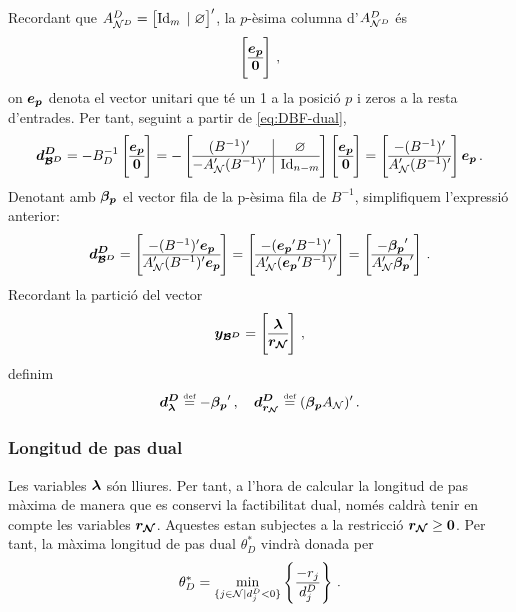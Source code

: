 Recordant que $A^D_{\mathcal{N}^D} = \left[\operatorname{Id}_{m} \;|\; \varnothing \right]'$, la 
$p$-èsima columna d'$A^D_{\mathcal{N}^D}$ és
\[
\left[
\begin{array}{@{}c@{}}
\vb{e_p}\\
\hline
\vb{0}
\end{array}
\right]\,,
\]
on $\boldsymbol{e_p}$ denota el vector unitari que té un 1 a la posició $p$ i zeros a 
la resta d'entrades. Per tant, seguint a partir de \eqref{eq:DBF-dual},
\[
\vb{d^D_{\B^D}} = -B^{-1}_D
\left[
\begin{array}{@{}c@{}}
\vb{e_p}\\
\hline
\vb{0}
\end{array}
\right]
%
= 
%
- \left[
\begin{array}{@{}c|c@{}}
(B^{-1})'	  &	\varnothing	\\
\hline
-A_\N'(B^{-1})' & \Id_{n-m}
\end{array}
\right]
\left[
\begin{array}{@{}c@{}}
\vb{e_p}\\
\hline
\vb{0}
\end{array}
\right]
%
=
%
\left[
\begin{array}{@{}c@{}}
-(B^{-1})'\\
\hline
A_\N'(B^{-1})'
\end{array}
\right]
\vb{e_p}\,.
\]
Denotant amb $\boldsymbol{\beta_p}$ el vector fila de la p-èsima fila de $B^{-1}$, 
simplifiquem l'expressió anterior:
\[
\vb{d^D_{\B^D}} =
\left[
\begin{array}{@{}c@{}}
-(B^{-1})'\vb{e_p}\\
\hline
A_\N'(B^{-1})'\vb{e_p}
\end{array}
\right]
%
=
%
\left[
\begin{array}{@{}c@{}}
-(\vb{e_p}'B^{-1})'\\
\hline
A_\N'(\vb{e_p}'B^{-1})'
\end{array}
\right]
%
=
%
\left[
\begin{array}{@{}c@{}}
-\vb{\beta_p}'\\
\hline
A_\N'\vb{\beta_p}'
\end{array}
\right]\,.
\]
Recordant la partició del vector 
\[
\vb{y_{\B^D}} =
\left[
\begin{array}{@{}c@{}}
\vb{\lambda}\\
\hline
\vb{r_\N}
\end{array}
\right]\,,
\]
definim
\[
\boldsymbol{d^D_\lambda} \stackrel{\text{\tiny def}}{=} -\boldsymbol{\beta_p}'\,, \quad \boldsymbol{d^D_{r_{\mathcal{N}}}} \stackrel{\text{\tiny def}}{=} 
(\boldsymbol{\beta_p} A_{\mathcal{N}})'\,.
\]

\subsubsection{Longitud de pas dual}
Les variables $\boldsymbol{\lambda}$ són lliures. Per tant, a l'hora de calcular la 
longitud de pas màxima de manera que es conservi la factibilitat dual, només 
caldrà tenir en compte les variables $\boldsymbol{r_{\mathcal{N}}}$. Aquestes estan subjectes a la 
restricció $\boldsymbol{r_{\mathcal{N}}} \ge \boldsymbol{0}$. Per tant, la màxima longitud de pas dual 
$\theta^\ast_D$ vindrà donada per
\[
\theta_D^\ast = \min\limits_{\{j\in \mathcal{N} \mid d^D_j < 0 \}} 
\left\{\frac{-r_j}{d^D_j}\right\}\,.
\]

